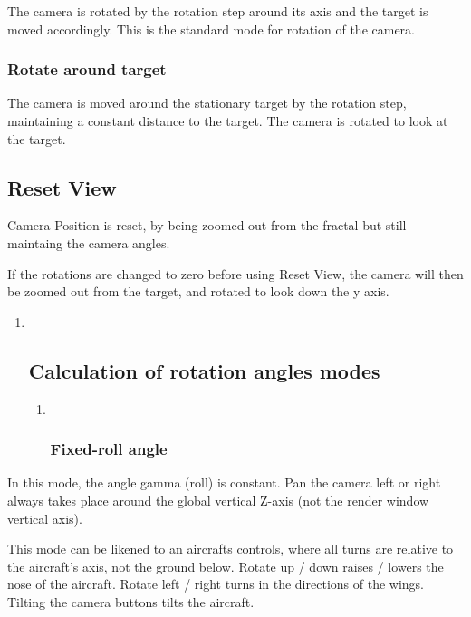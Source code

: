 The camera is rotated by the rotation step around its axis and the
target is moved accordingly. This is the standard mode for rotation of
the camera.

\subsubsection{Rotate around target}\label{rotate-around-target}

The camera is moved around the stationary target by the rotation step,
maintaining a constant distance to the target. The camera is rotated to
look at the target.

\subsection{Reset View}\label{reset-view}

Camera Position is reset, by being zoomed out from the fractal but still
maintaing the camera angles.

If the rotations are changed to zero before using Reset View, the camera
will then be zoomed out from the target, and rotated to look down the y
axis.

\begin{enumerate}
\def\labelenumi{\arabic{enumi}.}
\item ~
  \subsection{Calculation of rotation angles
  modes}\label{calculation-of-rotation-angles-modes}

  \begin{enumerate}
  \def\labelenumii{\alph{enumii}.}
  \item ~
    \subsubsection{Fixed-roll angle}\label{fixed-roll-angle}
  \end{enumerate}
\end{enumerate}

In this mode, the angle gamma (roll) is constant. Pan the camera left or
right always takes place around the global vertical Z-axis (not the
render window vertical axis).

This mode can be likened to an aircrafts controls, where all turns are
relative to the aircraft's axis, not the ground below. Rotate up / down
raises / lowers the nose of the aircraft. Rotate left / right turns in
the directions of the wings. Tilting the camera buttons tilts the
aircraft.

